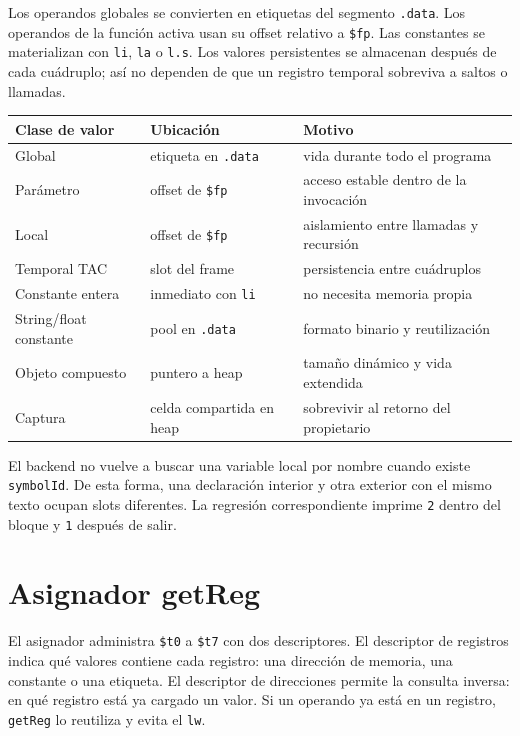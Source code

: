\documentclass[11pt,letterpaper,oneside]{report}
\newcommand{\codigo}[1]{\texttt{#1}}
\begin{document}
Los operandos globales se convierten en etiquetas del segmento \codigo{.data}. Los operandos de la funci\'on activa usan su offset relativo a \codigo{\$fp}. Las constantes se materializan con \codigo{li}, \codigo{la} o \codigo{l.s}. Los valores persistentes se almacenan despu\'es de cada cu\'adruplo; as\'i no dependen de que un registro temporal sobreviva a saltos o llamadas.

\begin{longtable}{p{3cm}p{4.2cm}p{5.9cm}}
\toprule
Clase de valor & Ubicaci\'on & Motivo\\\midrule
\endhead
Global & etiqueta en \codigo{.data} & vida durante todo el programa\\
Par\'ametro & offset de \codigo{\$fp} & acceso estable dentro de la invocaci\'on\\
Local & offset de \codigo{\$fp} & aislamiento entre llamadas y recursi\'on\\
Temporal TAC & slot del frame & persistencia entre cu\'adruplos\\
Constante entera & inmediato con \codigo{li} & no necesita memoria propia\\
String/float constante & pool en \codigo{.data} & formato binario y reutilizaci\'on\\
Objeto compuesto & puntero a heap & tama\~no din\'amico y vida extendida\\
Captura & celda compartida en heap & sobrevivir al retorno del propietario\\
\bottomrule
\end{longtable}

El backend no vuelve a buscar una variable local por nombre cuando existe \codigo{symbolId}. De esta forma, una declaraci\'on interior y otra exterior con el mismo texto ocupan slots diferentes. La regresi\'on correspondiente imprime \codigo{2} dentro del bloque y \codigo{1} despu\'es de salir.

\section{Asignador getReg}

El asignador administra \codigo{\$t0} a \codigo{\$t7} con dos descriptores. El descriptor de registros indica qu\'e valores contiene cada registro: una direcci\'on de memoria, una constante o una etiqueta. El descriptor de direcciones permite la consulta inversa: en qu\'e registro est\'a ya cargado un valor. Si un operando ya est\'a en un registro, \codigo{getReg} lo reutiliza y evita el \codigo{lw}.
\end{document}
